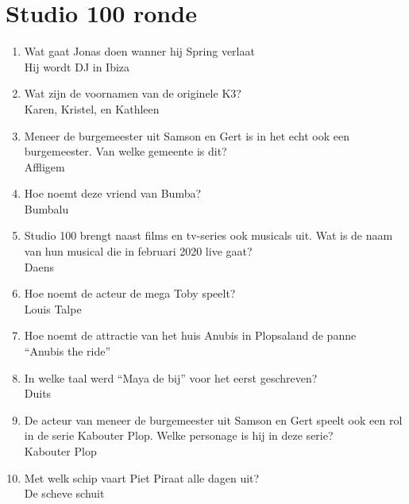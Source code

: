 \section{Studio 100 ronde}
\begin{enumerate}
\item{Wat gaat Jonas doen wanner hij Spring verlaat\\ Hij wordt DJ in Ibiza}
\item{Wat zijn de voornamen van de originele K3?\\ Karen, Kristel, en Kathleen}
\item{Meneer de burgemeester uit Samson en Gert is in het echt ook een burgemeester. Van welke gemeente is dit?\\ Affligem}
\item{Hoe noemt deze vriend van Bumba?\\ Bumbalu}
\item{Studio 100 brengt naast films en tv-series ook musicals uit. Wat is de naam van hun musical die in februari 2020 live gaat?\\ Daens}
\item{Hoe noemt de acteur de mega Toby speelt?\\ Louis Talpe}
\item{Hoe noemt de attractie van het huis Anubis in Plopsaland de panne\\ “Anubis the ride”}
\item{In welke taal werd “Maya de bij” voor het eerst geschreven?\\ Duits}
\item{De acteur van meneer de burgemeester uit Samson en Gert speelt ook een rol in de serie Kabouter Plop. Welke personage is hij in deze serie?\\ Kabouter Plop}
\item{Met welk schip vaart Piet Piraat alle dagen uit?\\ De scheve schuit}
\end{enumerate}
